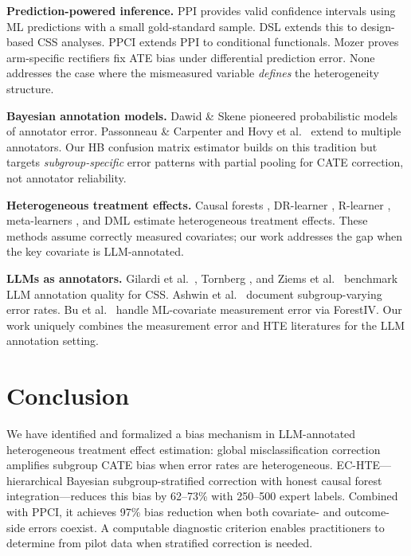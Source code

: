 \documentclass[11pt,twocolumn]{article}
\theoremstyle{remark}
\begin{document}
\textbf{Prediction-powered inference.}
PPI \cite{angelopoulos2023prediction} provides valid confidence intervals using ML predictions with a small gold-standard sample.
DSL \cite{egami2024using} extends this to design-based CSS analyses.
PPCI \cite{sui2026ppci} extends PPI to conditional functionals.
Mozer \cite{mozer2026} proves arm-specific rectifiers fix ATE bias under differential prediction error.
None addresses the case where the mismeasured variable \emph{defines} the heterogeneity structure.

\textbf{Bayesian annotation models.}
Dawid \& Skene \cite{dawid1979maximum} pioneered probabilistic models of annotator error.
Passonneau \& Carpenter \cite{passonneau2014benefits} and Hovy et al.\ \cite{hovy2013learning} extend to multiple annotators.
Our HB confusion matrix estimator builds on this tradition but targets \emph{subgroup-specific} error patterns with partial pooling for CATE correction, not annotator reliability.

\textbf{Heterogeneous treatment effects.}
Causal forests \cite{wager2018estimation, athey2019generalized}, DR-learner \cite{kennedy2023towards}, R-learner \cite{nie2021quasi}, meta-learners \cite{kunzel2019metalearners}, and DML \cite{chernozhukov2018double} estimate heterogeneous treatment effects.
These methods assume correctly measured covariates; our work addresses the gap when the key covariate is LLM-annotated.

\textbf{LLMs as annotators.}
Gilardi et al.\ \cite{gilardi2023chatgpt}, Tornberg \cite{tornberg2024chatgpt}, and Ziems et al.\ \cite{ziems2024can} benchmark LLM annotation quality for CSS.
Ashwin et al.\ \cite{ashwin2025using} document subgroup-varying error rates.
Bu et al.\ \cite{bu2023treatment} handle ML-covariate measurement error via ForestIV.
Our work uniquely combines the measurement error and HTE literatures for the LLM annotation setting.

\section{Conclusion}

We have identified and formalized a bias mechanism in LLM-annotated heterogeneous treatment effect estimation: global misclassification correction amplifies subgroup CATE bias when error rates are heterogeneous.
EC-HTE---hierarchical Bayesian subgroup-stratified correction with honest causal forest integration---reduces this bias by 62--73\% with 250--500 expert labels.
Combined with PPCI, it achieves 97\% bias reduction when both covariate- and outcome-side errors coexist.
A computable diagnostic criterion enables practitioners to determine from pilot data when stratified correction is needed.
\end{document}
